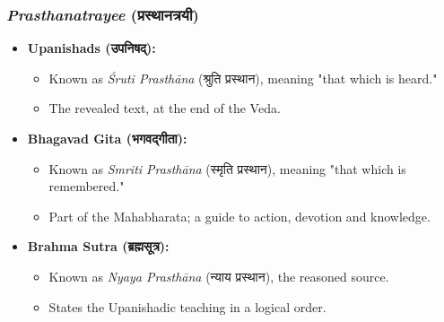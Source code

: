 \begin{frame}[fragile]\frametitle{\textit{Prasthanatrayee} (प्रस्थानत्रयी)}
    \begin{itemize}
        \item \textbf{Upanishads (उपनिषद्):}
        \begin{itemize}
            \item Known as \textit{Śruti Prasthāna} (श्रुति प्रस्थान), meaning "that which is heard."
            \item The revealed text, at the end of the Veda.
        \end{itemize}
        \item \textbf{Bhagavad Gita (भगवद्गीता):}
        \begin{itemize}
            \item Known as \textit{Smriti Prasthāna} (स्मृति प्रस्थान), meaning "that which is remembered."
            \item Part of the Mahabharata; a guide to action, devotion and knowledge.
        \end{itemize}
        \item \textbf{Brahma Sutra (ब्रह्मसूत्र):}
        \begin{itemize}
            \item Known as \textit{Nyaya Prasthāna} (न्याय प्रस्थान), the reasoned source.
            \item States the Upanishadic teaching in a logical order.
        \end{itemize}
    \end{itemize}
\end{frame}



